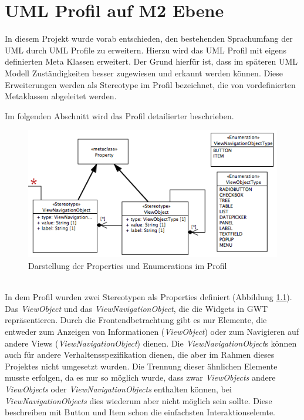 \chapter{UML Profil auf M2 Ebene}
\label{UMLProfil}
In diesem Projekt wurde vorab entschieden, den bestehenden Sprachumfang der UML durch UML Profile zu erweitern. Hierzu wird das UML Profil mit eigens definierten Meta Klassen erweitert. Der Grund hierfür ist, dass im späteren UML Modell Zuständigkeiten besser zugewiesen und erkannt werden können. Diese Erweiterungen werden als Stereotype im Profil bezeichnet, die von vordefinierten Metaklassen abgeleitet werden.

Im folgenden Abschnitt wird das Profil detailierter beschrieben.
\begin{figure}[ht]
\begin{center}
\includegraphics[width=\textwidth]{./img/ProfilProp.png}
\caption{Darstellung der Properties und Enumerations im
Profil}\label{Fig:UMLProfilProp}
\end{center}
\end{figure}\\
In dem Profil wurden zwei Stereotypen als Properties definiert (Abbildung \ref{Fig:UMLProfilProp}). Das \textit{ViewObject} und das \textit{ViewNavigationObject}, die die Widgets in GWT repräsentieren. Durch die Frontendbetrachtung gibt es nur Elemente, die entweder zum Anzeigen von Informationen (\textit{ViewObject}) oder zum Navigieren auf andere Views (\textit{ViewNavigationObject}) dienen. Die \textit{ViewNavigationObject}s können auch für andere Verhaltensspezifikation dienen, die aber im Rahmen dieses Projektes nicht umgesetzt wurden. Die Trennung dieser ähnlichen Elemente musste erfolgen, da es nur so möglich wurde, dass zwar \textit{ViewObjects} andere \textit{ViewObjects} oder \textit{ViewNavigationObjects} enthalten können, bei \textit{ViewNavigationObjects} dies wiederum aber nicht möglich sein sollte. Diese beschreiben mit Button und Item schon die einfachsten Interaktionselemte.
